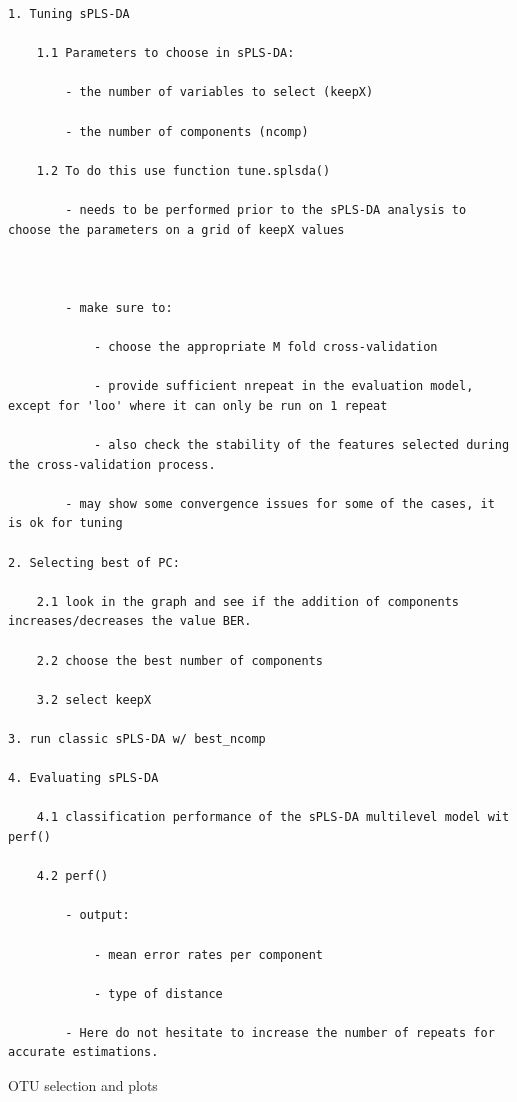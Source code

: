 \documentclass[
]{book}
\begin{document}
\begin{verbatim}
1. Tuning sPLS-DA

    1.1 Parameters to choose in sPLS-DA:

        - the number of variables to select (keepX)

        - the number of components (ncomp)

    1.2 To do this use function tune.splsda()

        - needs to be performed prior to the sPLS-DA analysis to choose the parameters on a grid of keepX values



        - make sure to:

            - choose the appropriate M fold cross-validation

            - provide sufficient nrepeat in the evaluation model, except for 'loo' where it can only be run on 1 repeat

            - also check the stability of the features selected during the cross-validation process.

        - may show some convergence issues for some of the cases, it is ok for tuning

2. Selecting best of PC:

    2.1 look in the graph and see if the addition of components increases/decreases the value BER.

    2.2 choose the best number of components

    3.2 select keepX

3. run classic sPLS-DA w/ best_ncomp

4. Evaluating sPLS-DA

    4.1 classification performance of the sPLS-DA multilevel model wit perf()

    4.2 perf()

        - output:

            - mean error rates per component

            - type of distance

        - Here do not hesitate to increase the number of repeats for accurate estimations.
\end{verbatim}

OTU selection and plots
\end{document}
